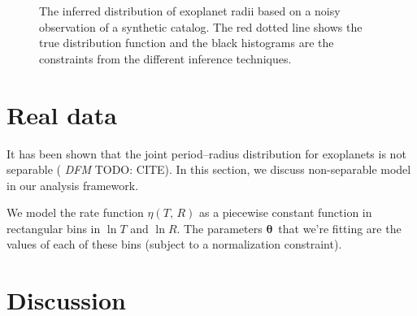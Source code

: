 \documentclass[12pt,preprint]{aastex}
\newcommand{\figlabel}[1]{\label{fig:#1}}
\newcommand{\bvec}[1]{\ensuremath{\boldsymbol{#1}}}
\newcommand{\todo}[3]{{\color{#2} \emph{#1} TODO: #3}}
\newcommand{\dfmtodo}[1]{\todo{DFM}{red}{#1}}
\newcommand{\rate}{\ensuremath{\eta}}
\newcommand{\ratepars}{{\ensuremath{\bvec{\theta}}}}
\newcommand{\radius}{\ensuremath{R}}
\newcommand{\period}{\ensuremath{T}}
\begin{document}
\begin{figure}[htbp]
\begin{center}
\end{center}
\caption{%
The inferred distribution of exoplanet radii based on a noisy observation of a
synthetic catalog.
The red dotted line shows the true distribution function and the black
histograms are the constraints from the different inference techniques.
\figlabel{synthetic-radius}}
\end{figure}

\section{Real data}

It has been shown that the joint period--radius distribution for exoplanets is
not separable (\dfmtodo{CITE}).
In this section, we discuss non-separable model in our analysis framework.

We model the rate function $\rate(\period,\,\radius)$ as a piecewise constant
function in rectangular bins in $\ln\period$ and $\ln\radius$.
The parameters \ratepars\ that we're fitting are the values of each of these
bins (subject to a normalization constraint).

\section{Discussion}
\end{document}
